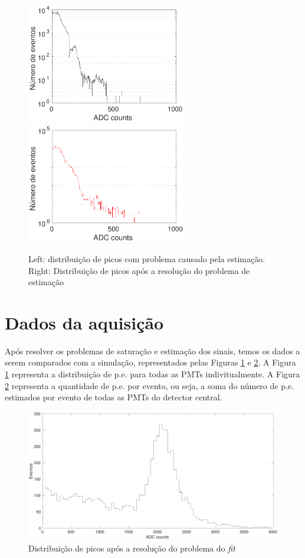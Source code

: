 \begin{figure}[H]
	\centering
	\includegraphics[width=7cm]{textuais/dadosreais/figuras/peakdist_errado.pdf}
	\includegraphics[width=7cm]{textuais/dadosreais/figuras/peakdist.pdf}
	\caption{Left: distribuição de picos com problema causado pela estimação. Right: Distribuição de picos após a resolução do problema de estimação}
	\label{fig:peakdist}
\end{figure}

\section{Dados da aquisição}

Após resolver os problemas de saturação e estimação dos sinais, temos os dados  a serem comparados com a simulação, representados pelas Figuras \ref{fig:peakdist} e \ref{fig:hist_evt}.
A Figura \ref{fig:peakdist} representa a distribuição de p.e. para todas as PMTs indivitualmente.
A Figura \ref{fig:hist_evt} representa a quantidade de p.e. por evento, ou seja, a soma do número de p.e. estimados por evento de todas as PMTs do detector central. 
\\

\begin{figure}[H]
	\centering
	\includegraphics[width=12cm]{textuais/dadosreais/figuras/FigureName_Fig_5.pdf}
	\caption{Distribuição de picos após a resolução do problema do \emph{fit}}
	\label{fig:hist_evt}
\end{figure}

